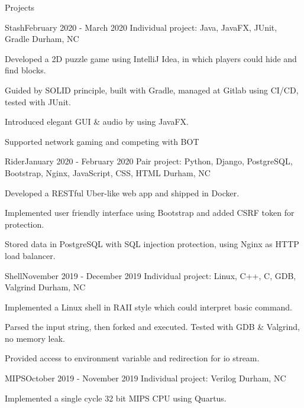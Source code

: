 \documentclass{resume} %
\begin{document}
\begin{rSection}{Projects}
    \begin{rSubsection}{Stash}{February 2020 - March 2020}
        {Individual project: Java, JavaFX, JUnit, Gradle}
        {Durham, NC}
        \item Developed a 2D puzzle game using IntelliJ Idea, in which players could hide and find blocks. 
        \item Guided by SOLID principle, built with Gradle, managed at Gitlab using CI/CD, tested with JUnit.
        \item Introduced elegant GUI \& audio by using JavaFX.
        \item Supported network gaming and competing with BOT
        \end{rSubsection}

    \begin{rSubsection}{Rider}{January 2020 - February 2020}
        {Pair project: Python, Django, PostgreSQL, Bootstrap, Nginx, JavaScript, CSS, HTML}
        {Durham, NC}
        \item Developed a RESTful Uber-like web app and shipped in Docker.
        \item Implemented user friendly interface using Bootstrap and added CSRF token for protection.
        \item Stored data in PostgreSQL with SQL injection protection, using Nginx as HTTP load balancer.
        \end{rSubsection}

    \begin{rSubsection}{Shell}{November 2019 - December 2019}
    {Individual project: Linux, C++, C, GDB, Valgrind}
    {Durham, NC}
    \item Implemented a Linux shell in RAII style which could interpret basic command.
    \item Parsed the input string, then forked and executed. Tested with GDB \& Valgrind, no memory leak.
    \item Provided access to environment variable and redirection for io stream.
    \end{rSubsection}

    \begin{rSubsection}{MIPS}{October 2019 - November 2019}
        {Individual project: Verilog}
        {Durham, NC}
        \item Implemented a single cycle 32 bit MIPS CPU using Quartus.
        \end{rSubsection}
    



\end{rSection}
\end{document}
